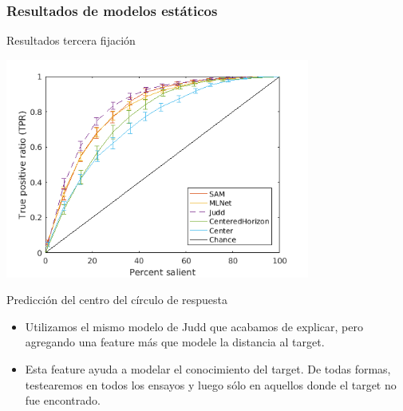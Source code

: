 \documentclass[compress]{beamer}
\begin{document}
\subsubsection{Resultados de modelos estáticos}
\begin{frame}{Resultados tercera fijación}
\begin{center}
\includegraphics[width=0.75\textwidth]{images/results_fix_3_to_3_all.png} 
\end{center}

\end{frame}


\begin{frame}{Predicción del centro del círculo de respuesta}
\begin{itemize}
\item Utilizamos el mismo modelo de Judd que acabamos de explicar, pero agregando una feature más que modele la distancia al target.
\item Esta feature ayuda a modelar el conocimiento del target. De todas formas, testearemos en todos los ensayos y luego sólo en aquellos donde el target no fue encontrado.
\end{itemize}
\end{frame}
\end{document}
